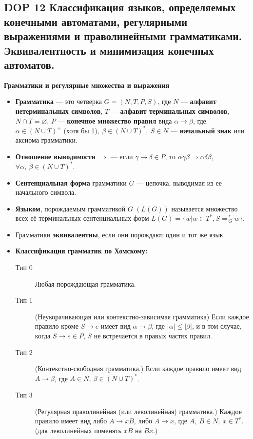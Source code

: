 \subsection*{DOP 12 Классификация  языков,  определяемых  конечными  автоматами,  регулярными  выражениями  и праволинейными грамматиками. Эквивалентность и минимизация конечных автоматов.}

\textbf{Грамматики и регулярные множества и выражения}
\begin{itemize}
    \item \textbf{Грамматика} --- это четверка $G = (N, T, P, S)$, где $N$ --- \textbf{алфавит нетерминальных символов}, $T$ --- \textbf{алфавит терминальных символов}, $N \cap T = \varnothing$, $P$ --- \textbf{конечное множество правил} вида $\alpha \rightarrow \beta$, где $\alpha \in (N \cup T)^+$ (хотя бы 1)$,~\beta \in (N \cup T)^\ast,~S \in N$ --- \textbf{начальный знак} или аксиома грамматики.
    \item \textbf{Отношение выводимости} $\Rightarrow$ --- если $\gamma \rightarrow \delta \in P$, то $\alpha \gamma \beta \Rightarrow \alpha \delta \beta$, $\forall \alpha,~\beta \in (N \cup T)^\ast$.
    \item \textbf{Сентенциальная форма} грамматики $G$ --- цепочка, выводимая из ее начального символа.
    \item \textbf{Языком}, порождаемым грамматикой $G$ $(L(G))$ называется множество всех её терминальных сентенциальных форм $L(G) = \{ w |w \in T^\ast , S \Rightarrow^{\ast}_G w\}$.
    \item Грамматики \textbf{эквивалентны}, если они порождают один и тот же язык.
    \item \textbf{Классификация грамматик по Хомскому:}
    \begin{description}
        \item[Тип 0] Любая порождающая грамматика.
        \item[Тип 1] (Неукорачивающая или контекстно-зависимая грамматика) Если каждое правило кроме $S \rightarrow e$ имеет вид $\alpha \rightarrow \beta$, где $|\alpha| \leqslant |\beta|$, и в том случае, когда $S \rightarrow e \in P$, $S$ не встречается в правых частях правил.
        \item[Тип 2] (Контекстно-свободная грамматика.) Если каждое правило имеет вид $A \rightarrow \beta$, где $A \in N,~\beta \in (N \cup T)^\ast$.
        \item[Тип 3] (Регулярная праволинейная (или леволинейная) грамматика.) Каждое правило имеет вид либо $A \rightarrow xB$, либо $A \rightarrow x$, где $A,~B \in N,~x \in T^\ast$. (для леволинейных поменять $xB$ на $Bx$.)

\end{description}
\end{itemize}
